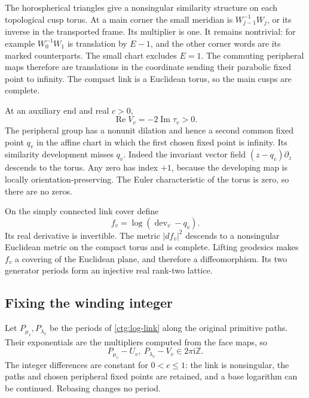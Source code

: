 \documentclass[11pt]{article}
\numberwithin{equation}{section}
\theoremstyle{definition}
\theoremstyle{remark}
\newcommand{\ii}{\mathrm i}
\newcommand{\Rea}{\operatorname{Re}}
\newcommand{\Ima}{\operatorname{Im}}
\begin{document}
The horospherical triangles give a nonsingular similarity structure on
each topological cusp torus. At a main corner the small meridian is
$W_{j-1}^{-1}W_j$, or its inverse in the transported frame. Its
multiplier is one. It remains nontrivial: for example
$W_0^{-1}W_1$ is translation by $E-1$, and the other corner words
are its marked counterparts. The small chart excludes $E=1$.
The commuting peripheral maps therefore are translations in the coordinate sending their parabolic fixed point to infinity. The compact link is a Euclidean torus, so the main
cusps are complete.

At an auxiliary end and real $c>0$,
\begin{equation}\label{ctg:nonunit}
 \Rea V_v=-2\Ima\tau_v>0.
\end{equation}
The peripheral group has a nonunit dilation and hence a second common
fixed point $q_v$ in the affine chart in which the first chosen fixed point is infinity.
Its similarity development misses $q_v$. Indeed the invariant vector
field $(z-q_v)\partial_z$ descends to the torus. Any zero has index
$+1$, because the developing map is locally orientation-preserving.
The Euler characteristic of the torus is zero, so there are no zeros.

On the simply connected link cover define
\begin{equation}\label{ctg:log-link}
 f_v=\log(\operatorname{dev}_v-q_v).
\end{equation}
Its real derivative is invertible. The metric $|df_v|^2$ descends to a
nonsingular Euclidean metric on the compact torus and is complete.
Lifting geodesics makes $f_v$ a covering of the Euclidean plane, and
therefore a diffeomorphism. Its two generator periods form an injective
real rank-two lattice.

\subsection{Fixing the winding integer}
\label{ctg:actual-periods}
Let $P_{\mu_v},P_{\lambda_v}$ be the periods of \eqref{ctg:log-link}
along the original primitive paths. Their exponentials are the
multipliers computed from the face maps, so
\begin{equation}\label{ctg:integer-periods}
 P_{\mu_v}-U_v,\ P_{\lambda_v}-V_v\in2\pi\ii\mathbb Z.
\end{equation}
The integer differences are constant for $0<c\le1$: the link is nonsingular,
the paths and chosen peripheral fixed points are retained, and a base logarithm can be continued.
Rebasing changes no period.
\end{document}
